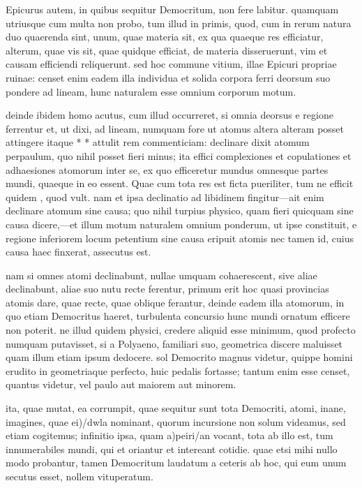  Epicurus autem, in quibus sequitur Democritum, non fere labitur. quamquam utriusque cum multa non probo, tum illud in primis, quod, cum in rerum natura duo quaerenda sint, unum, quae materia sit, ex qua quaeque res efficiatur, alterum, quae vis sit, quae quidque efficiat, de materia disseruerunt, vim et causam efficiendi reliquerunt. sed hoc commune vitium, illae Epicuri propriae ruinae: censet enim eadem illa individua et solida corpora ferri deorsum suo pondere ad lineam, hunc naturalem esse omnium corporum motum.

 deinde ibidem homo acutus, cum illud occurreret, si omnia deorsus e regione ferrentur et, ut dixi, ad lineam, numquam fore ut atomus altera alteram posset attingere itaque * * attulit rem commenticiam: declinare dixit atomum perpaulum, quo nihil posset fieri minus; ita effici complexiones et copulationes et adhaesiones atomorum inter se, ex quo efficeretur mundus omnesque partes mundi, quaeque in eo essent. Quae cum tota res est ficta pueriliter, tum ne efficit quidem , quod vult. nam et ipsa declinatio ad libidinem fingitur—ait enim declinare atomum sine causa; quo nihil turpius physico, quam fieri quicquam sine causa dicere,—et illum motum naturalem omnium ponderum, ut ipse constituit, e regione inferiorem locum petentium sine causa eripuit atomis nec tamen id, cuius causa haec finxerat, assecutus est.

 nam si omnes atomi declinabunt, nullae umquam cohaerescent, sive aliae declinabunt, aliae suo nutu recte ferentur, primum erit hoc quasi provincias atomis dare, quae recte, quae oblique ferantur, deinde eadem illa atomorum, in quo etiam Democritus haeret, turbulenta concursio hunc mundi ornatum efficere non poterit. ne illud quidem physici, credere aliquid esse minimum, quod profecto numquam putavisset, si a Polyaeno, familiari suo, geometrica discere maluisset quam illum etiam ipsum dedocere. sol Democrito magnus videtur, quippe homini erudito in geometriaque perfecto, huic pedalis fortasse; tantum enim esse censet, quantus videtur, vel paulo aut maiorem aut minorem.

 ita, quae mutat, ea corrumpit, quae sequitur sunt tota Democriti, atomi, inane, imagines, quae ei)/dwla nominant, quorum incursione non solum videamus, sed etiam cogitemus; infinitio ipsa, quam a)peiri/an vocant, tota ab illo est, tum innumerabiles mundi, qui et oriantur et intereant cotidie. quae etsi mihi nullo modo probantur, tamen Democritum laudatum a ceteris ab hoc, qui eum unum secutus esset, nollem vituperatum.

